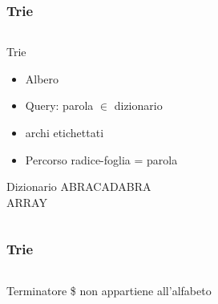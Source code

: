 \begin{frame}
  \titlepage
\end{frame}


\begin{frame}[fragile]
\frametitle{Trie}
\begin{columns}
\begin{column}{0.6\textwidth}
\begin{block}{Trie}
\begin{itemize}
\item
Albero
\item
Query: parola $\in$ dizionario
\item
archi etichettati
\item
Percorso radice-foglia = parola
\end{itemize}
\end{block}
\begin{block}{Dizionario}
ABRACADABRA\\
ARRAY\\
\end{block}
\end{column}
\begin{column}{0.4\textwidth}
\begin{center}
\end{center}
\end{column}
\end{columns}
\end{frame}

\begin{frame}[fragile]
\frametitle{Trie}
\begin{columns}
\begin{column}{0.6\textwidth}
\begin{block}{Terminatore}
\$ non appartiene all'alfabeto
\end{block}
\end{column}
\begin{column}{0.4\textwidth}
\begin{center}
\end{center}
\end{column}
\end{columns}
\end{frame}

